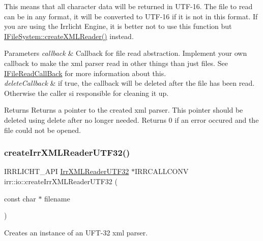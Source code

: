 This means that all character data will be returned in U\+T\+F-\/16. The file to read can be in any format, it will be converted to U\+T\+F-\/16 if it is not in this format. If you are using the Irrlicht Engine, it is better not to use this function but \hyperlink{classirr_1_1io_1_1IFileSystem_a167c9fa159d16ee5c56c074636b0865e}{I\+File\+System\+::create\+X\+M\+L\+Reader()} instead. 
\begin{DoxyParams}{Parameters}
{\em callback} & Callback for file read abstraction. Implement your own callback to make the xml parser read in other things than just files. See \hyperlink{classirr_1_1io_1_1IFileReadCallBack}{I\+File\+Read\+Call\+Back} for more information about this. \\
\hline
{\em delete\+Callback} & if true, the callback will be deleted after the file has been read. Otherwise the caller si responsible for cleaning it up. \\
\hline
\end{DoxyParams}
\begin{DoxyReturn}{Returns}
Returns a pointer to the created xml parser. This pointer should be deleted using \textquotesingle{}delete\textquotesingle{} after no longer needed. Returns 0 if an error occured and the file could not be opened. 
\end{DoxyReturn}
\mbox{\label{namespaceirr_1_1io_a69d4b7a461a7a0b8715d346bbe9a49b0}} 
\subsubsection{\texorpdfstring{create\+Irr\+X\+M\+L\+Reader\+U\+T\+F32()}{createIrrXMLReaderUTF32()}\hspace{0.1cm}{\footnotesize\ttfamily [1/3]}}
{\footnotesize\ttfamily I\+R\+R\+L\+I\+C\+H\+T\+\_\+\+A\+PI \hyperlink{namespaceirr_1_1io_aa596f324a302585d965b1a28c562561b}{Irr\+X\+M\+L\+Reader\+U\+T\+F32} $\ast$I\+R\+R\+C\+A\+L\+L\+C\+O\+NV irr\+::io\+::create\+Irr\+X\+M\+L\+Reader\+U\+T\+F32 (\begin{DoxyParamCaption}\item[{const char $\ast$}]{filename }\end{DoxyParamCaption})}



Creates an instance of an U\+F\+T-\/32 xml parser. 

